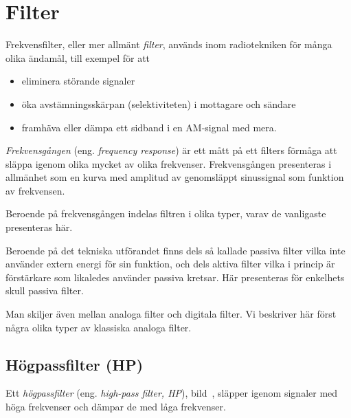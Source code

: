 \section{Filter}
\label{filter}

Frekvensfilter, eller mer allmänt \emph{filter}, används inom radiotekniken för
många olika ändamål, till exempel för att
\begin{itemize}
  \item eliminera störande signaler
  \item öka avstämningsskärpan (selektiviteten) i mottagare och sändare
  \item framhäva eller dämpa ett sidband i en AM-signal med mera.
\end{itemize}

\emph{Frekvensgången} (eng. \emph{frequency response}) är ett mått på ett
filters förmåga att släppa igenom olika mycket av olika frekvenser.
Frekvensgången presenteras i allmänhet som en kurva med amplitud av genomsläppt
sinussignal som funktion av frekvensen.

Beroende på frekvensgången indelas filtren i olika typer, varav de vanligaste
presenteras här.

Beroende på det tekniska utförandet finns dels så kallade passiva filter vilka
inte använder extern energi för sin funktion, och dels aktiva filter vilka i princip
är förstärkare som likaledes använder passiva kretsar.
Här presenteras för enkelhets skull passiva filter.

Man skiljer även mellan analoga filter och digitala filter.
Vi beskriver här först några olika typer av klassiska analoga filter.

\subsection{Högpassfilter (HP)}


Ett \emph{högpassfilter} (eng. \emph{high-pass filter, HP}),
bild~, släpper igenom signaler med höga frekvenser och
dämpar de med låga frekvenser.

